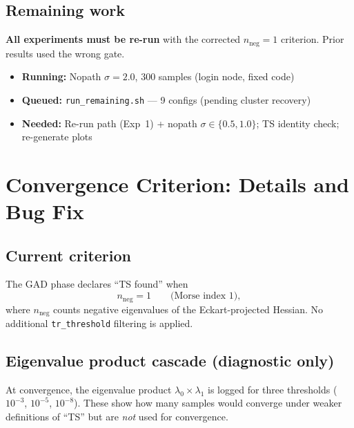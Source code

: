 \documentclass[11pt,a4paper]{article}
\newcommand{\eval}{\lambda}
\begin{document}
\subsection{Remaining work}

\textbf{All experiments must be re-run} with the corrected $n_\text{neg} = 1$
criterion.  Prior results used the wrong gate.

\begin{itemize}[nosep]
  \item[\textbullet] \textbf{Running:} Nopath $\sigma = 2.0$, 300 samples (login node, fixed code)
  \item[\textbullet] \textbf{Queued:} \texttt{run\_remaining.sh} --- 9 configs (pending cluster recovery)
  \item[\textbullet] \textbf{Needed:} Re-run path (Exp~1) + nopath $\sigma \in \{0.5, 1.0\}$;
        TS identity check; re-generate plots
\end{itemize}

\appendix

\section{Convergence Criterion: Details and Bug Fix}
\label{app:criterion}

\subsection{Current criterion}

The GAD phase declares ``TS found'' when
\begin{equation}
  n_\text{neg} = 1 \qquad \text{(Morse index 1)},
\end{equation}
where $n_\text{neg}$ counts negative eigenvalues of the Eckart-projected
Hessian.  No additional \texttt{tr\_threshold} filtering is applied.

\subsection{Eigenvalue product cascade (diagnostic only)}

At convergence, the eigenvalue product $\eval_0 \times \eval_1$ is logged
for three thresholds ($10^{-3}$, $10^{-5}$, $10^{-8}$).  These show how
many samples would converge under weaker definitions of ``TS'' but are
\emph{not} used for convergence.
\end{document}

